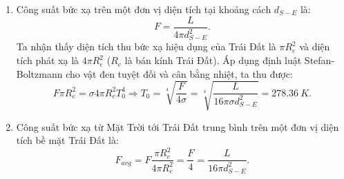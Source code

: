 \begin{enumerate}[label = \textbf{\arabic*.}]\itemsep0em 
        \item Công suất bức xạ trên một đơn vị diện tích tại khoảng cách \(d_{S-E}\) là: \\
        \begin{equation} \label{eq1_greenhouse_effect}
            F = \frac{L}{4\pi d_{S-E}^2}.
        \end{equation}
        Ta nhận thấy diện tích thu bức xạ hiệu dụng của Trái Đất là \(\pi R_e^2\) và diện tích phát xạ là \(4 \pi R_e^2\) (\(R_e\) là bán kính Trái Đất). Áp dụng định luật Stefan-Boltzmann cho vật đen tuyệt đối và cân bằng nhiệt, ta thu được:
        \begin{equation} \label{eq2_greenhouse_effect}
            F \pi R_e^2 = \sigma 4 \pi R_e^2 T_0^4 \Rightarrow T_0 = \sqrt[4]{\dfrac{F}{4 \sigma}} = \sqrt[4]{\frac{L}{16 \pi \sigma d_{S-E}^2}} = 278.36 \ \si{K}.
        \end{equation}
        \item Công suất bức xạ từ Mặt Trời tới Trái Đất trung bình trên một đơn vị diện tích bề mặt Trái Đất là:
        \begin{equation} \label{eq3_greenhouse_effect}
            F_{avg} = F\frac{\pi R_e^2}{4 \pi R_e^2} = \frac{F}{4} = \frac{L}{16 \pi d_{S-E}^2}.
        \end{equation}
\begin{center}
\begin{tikzpicture}[x=0.75pt,y=0.75pt,yscale=-1,xscale=1]


\end{tikzpicture}
\end{center}
\end{enumerate}
